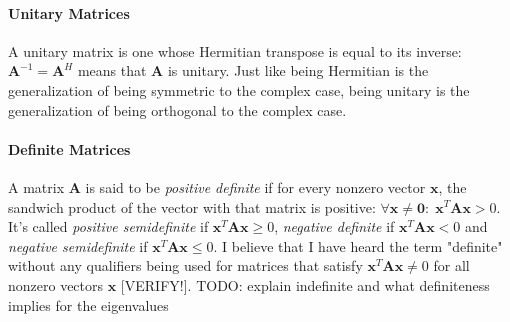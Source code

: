 

\paragraph{Unitary Matrices}
A unitary matrix is one whose Hermitian transpose is equal to its inverse: $\mathbf{A}^{-1} = \mathbf{A}^H$ means that $\mathbf{A}$ is unitary. Just like being Hermitian is the generalization of being symmetric to the complex case, being unitary is the generalization of being orthogonal to the complex case.




\paragraph{Definite Matrices}
A matrix $\mathbf{A}$ is said to be \emph{positive definite} if for every nonzero vector $\mathbf{x}$, the sandwich product of the vector with that matrix is positive: $\forall \mathbf{x \neq 0}: \; \mathbf{x}^T \mathbf{A x} > 0$. It's called \emph{positive semidefinite} if $\mathbf{x}^T \mathbf{A x} \geq 0$, \emph{negative definite} if $\mathbf{x}^T \mathbf{A x} < 0$ and \emph{negative semidefinite} if $\mathbf{x}^T \mathbf{A x} \leq 0$. I believe that I have heard the term "definite" without any qualifiers being used for matrices that satisfy $\mathbf{x}^T \mathbf{A x} \neq 0$ for all nonzero vectors $\mathbf{x}$ [VERIFY!]. TODO: explain indefinite and what definiteness implies for the eigenvalues




%



